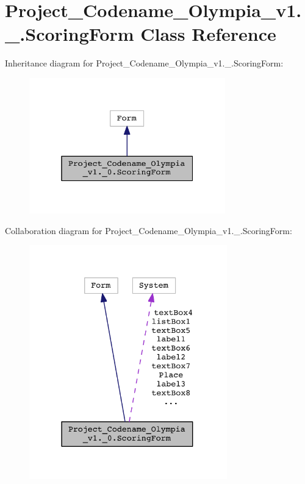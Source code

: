 \hypertarget{classProject__Codename__Olympia__v1_1_1__0_1_1ScoringForm}{}\section{Project\+\_\+\+Codename\+\_\+\+Olympia\+\_\+v1.\+\_.\+Scoring\+Form Class Reference}
\label{classProject__Codename__Olympia__v1_1_1__0_1_1ScoringForm}


Inheritance diagram for Project\+\_\+\+Codename\+\_\+\+Olympia\+\_\+v1.\+\_.\+Scoring\+Form\+:\nopagebreak
\begin{figure}[H]
\begin{center}
\leavevmode
\includegraphics[width=241pt]{classProject__Codename__Olympia__v1_1_1__0_1_1ScoringForm__inherit__graph}
\end{center}
\end{figure}


Collaboration diagram for Project\+\_\+\+Codename\+\_\+\+Olympia\+\_\+v1.\+\_.\+Scoring\+Form\+:\nopagebreak
\begin{figure}[H]
\begin{center}
\leavevmode
\includegraphics[width=243pt]{classProject__Codename__Olympia__v1_1_1__0_1_1ScoringForm__coll__graph}
\end{center}
\end{figure}
